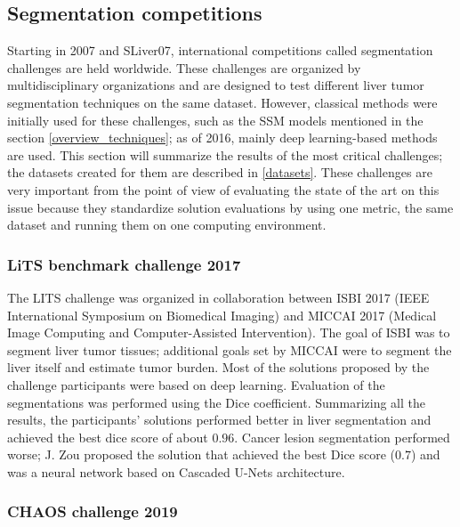 \subsection{Segmentation competitions}
\label{seg_competitions}
Starting in 2007 and SLiver07, international competitions called segmentation challenges are held worldwide. These challenges are organized by multidisciplinary organizations and are designed to test different liver tumor segmentation techniques on the same dataset. However, classical methods were initially used for these challenges, such as the SSM models mentioned in the section \ref{overview_techniques}; as of 2016, mainly deep learning-based methods are used. This section will summarize the results of the most critical challenges; the datasets created for them are described in \ref{datasets}.
These challenges are very important from the point of view of evaluating the state of the art on this issue because they standardize solution evaluations by using one metric, the same dataset and running them on one computing environment.

\subsubsection{LiTS benchmark challenge 2017}
The LITS challenge \cite{bilic_liver_2023} was organized in collaboration between ISBI 2017 (IEEE International Symposium
on Biomedical Imaging) and MICCAI 2017 (Medical Image Computing
and Computer-Assisted Intervention). The goal of ISBI was to segment liver tumor tissues; additional goals set by MICCAI were to segment the liver itself and estimate tumor burden. Most of the solutions proposed by the challenge participants were based on deep learning. Evaluation of the segmentations was performed using the Dice coefficient. Summarizing all the results, the participants' solutions performed better in liver segmentation and achieved the best dice score of about $0.96$. Cancer lesion segmentation performed worse; J. Zou proposed the solution that achieved the best Dice score ($0.7$) and was a neural network based on Cascaded U-Nets architecture.
\subsubsection{CHAOS challenge 2019}


